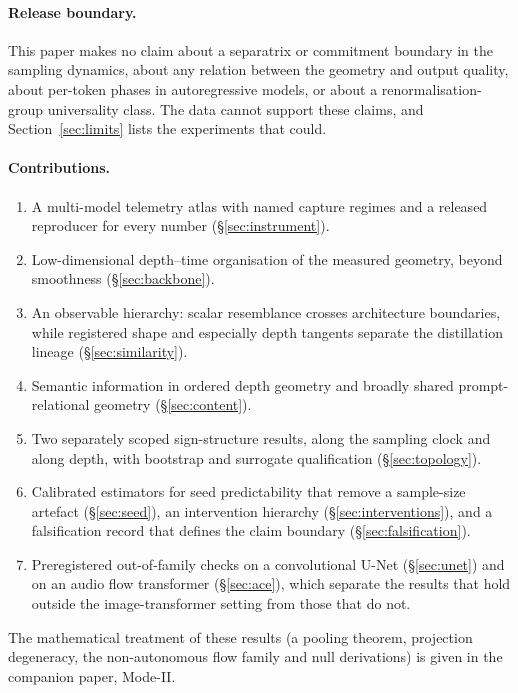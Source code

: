 \documentclass[11pt]{article}
\begin{document}
\paragraph{Release boundary.} This paper makes no claim about a separatrix or commitment boundary in the sampling dynamics, about any relation between the geometry and output quality, about per-token phases in autoregressive models, or about a renormalisation-group universality class. The data cannot support these claims, and Section~\ref{sec:limits} lists the experiments that could.

\paragraph{Contributions.}
\begin{enumerate}
 \item A multi-model telemetry atlas with named capture regimes and a released reproducer for every number (\S\ref{sec:instrument}).
 \item Low-dimensional depth--time organisation of the measured geometry, beyond smoothness (\S\ref{sec:backbone}).
 \item An observable hierarchy: scalar resemblance crosses architecture boundaries, while registered shape and especially depth tangents separate the distillation lineage (\S\ref{sec:similarity}).
 \item Semantic information in ordered depth geometry and broadly shared prompt-relational geometry (\S\ref{sec:content}).
 \item Two separately scoped sign-structure results, along the sampling clock and along depth, with bootstrap and surrogate qualification (\S\ref{sec:topology}).
 \item Calibrated estimators for seed predictability that remove a sample-size artefact (\S\ref{sec:seed}), an intervention hierarchy (\S\ref{sec:interventions}), and a falsification record that defines the claim boundary (\S\ref{sec:falsification}).
 \item Preregistered out-of-family checks on a convolutional U-Net (\S\ref{sec:unet}) and on an audio flow transformer (\S\ref{sec:ace}), which separate the results that hold outside the image-transformer setting from those that do not.
\end{enumerate}
The mathematical treatment of these results (a pooling theorem, projection degeneracy, the non-autonomous flow family and null derivations) is given in the companion paper, Mode-II.
\end{document}
